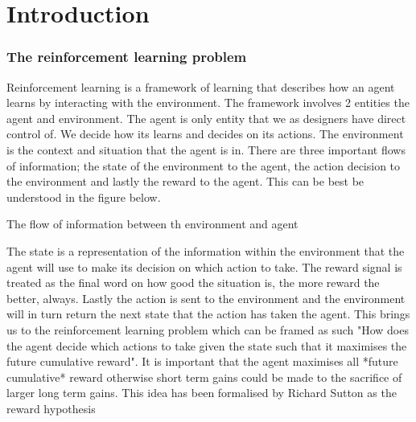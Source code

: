 \chapter{Introduction}\label{C:intro}

\subsection{The reinforcement learning problem}

Reinforcement learning is a framework of learning that describes how an agent learns by interacting with the environment. The framework involves 2 entities the agent and environment. The agent is only entity that we as designers have direct control of. We decide how its learns and decides on its actions. The environment is the context and situation that the agent is in. There are three important flows of information;  the state of the environment to the agent, the action decision to the environment and lastly the reward to the agent. This can be best be understood in the figure below.

\begin{fig}
\begin{center}
    \caption{The flow of information between th environment and agent}
\end{center}
\end{fig}

The state is a representation of the information within the environment that the agent will use to make its decision on which action to take. The reward signal is treated as the final word on how good the situation is, the more reward the better, always. Lastly the action is sent to the environment and the environment will in turn return the next state that the action has taken the agent. This brings us to the reinforcement learning problem which can be framed as such "How does the agent decide which actions to take given the state such that it maximises the future cumulative reward". It is important that the agent maximises all *future cumulative* reward otherwise short term gains could be made to the sacrifice of larger long term gains. This idea has been formalised by Richard Sutton as the reward hypothesis

